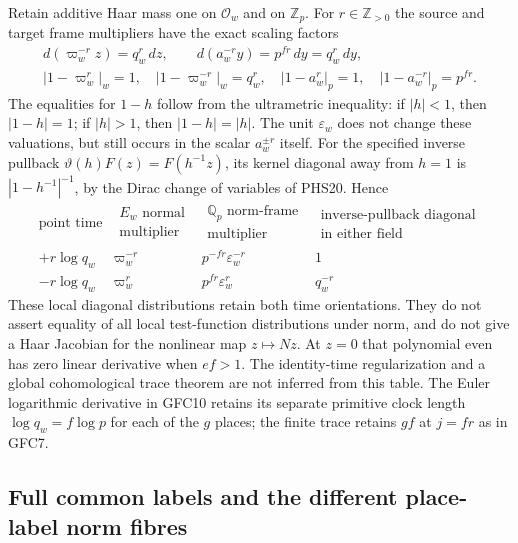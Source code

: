 Retain additive Haar mass one on $\mathcal O_w$ and on
$\mathbb Z_p$. For $r\in\mathbb Z_{>0}$ the source and target frame multipliers
have the exact scaling factors
\begin{equation}\tag{GFC24}
 \begin{gathered}
 d(\varpi_w^{-r}z)=q_w^r\,dz,
 \qquad d(a_w^{-r}y)=p^{fr}\,dy=q_w^r\,dy,\\
 |1-\varpi_w^r|_w=1,\quad
 |1-\varpi_w^{-r}|_w=q_w^r,\quad
 |1-a_w^r|_p=1,\quad |1-a_w^{-r}|_p=p^{fr}.
 \end{gathered}
\end{equation}
The equalities for $1-h$ follow from the ultrametric inequality:
if $|h|<1$, then $|1-h|=1$; if $|h|>1$, then $|1-h|=|h|$.
The unit $\varepsilon_w$ does not change these valuations, but
still occurs in the scalar $a_w^{\pm r}$ itself. For the specified
inverse pullback $\vartheta(h)F(z)=F(h^{-1}z)$, its kernel diagonal
away from $h=1$ is $|1-h^{-1}|^{-1}$, by the Dirac change of
variables of PHS20. Hence
\begin{equation}\tag{GFC25}
 \begin{array}{c|c|c|c}
 \text{point time}&\substack{E_w\text{ normal}\\\text{multiplier}}&
 \substack{\mathbb Q_p\text{ norm-frame}\\\text{multiplier}}&
 \substack{\text{inverse-pullback diagonal}\\\text{in either field}}\\ \hline
 +r\log q_w&\varpi_w^{-r}&p^{-fr}\varepsilon_w^{-r}&1\\
 -r\log q_w&\varpi_w^{r}&p^{fr}\varepsilon_w^{r}&q_w^{-r}
 \end{array}
\end{equation}
These local diagonal distributions retain both time orientations.
They do not assert equality of all local test-function distributions
under norm, and do not give a Haar Jacobian for the nonlinear
map $z\mapsto Nz$. At $z=0$ that polynomial even has zero linear
derivative when $ef>1$. The identity-time regularization and a
global cohomological trace theorem are not inferred from this table.
The Euler logarithmic derivative in GFC10 retains its separate
primitive clock length $\log q_w=f\log p$ for each of the $g$
places; the finite trace retains $gf$ at $j=fr$ as in GFC7.

\subsection{Full common labels and the different place-label norm fibres}

